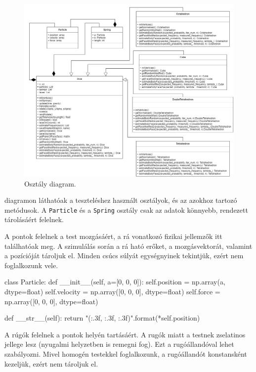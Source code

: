 \begin{figure}[h!]
	\centering
	\includegraphics[width=\textwidth]{images/uml.png}
	\caption{Osztály diagram.}
	\label{fig:uml}
\end{figure}

 diagramon láthatóak a teszteléshez használt osztályok, és az azokhoz tartozó metódusok.
A \texttt{Particle} és a \texttt{Spring} osztály csak az adatok könnyebb, rendezett tárolásáért felelnek.


A pontok felelnek a test mozgásáért, a rá vonatkozó fizikai jellemzők itt találhatóak meg.
A szimulálás során a rá ható erőket, a mozgásvektorát, valamint a pozícióját tároljuk el.
Minden csúcs súlyát egységnyinek tekintjük, ezért nem foglalkozunk vele.

\begin{python}
class Particle:
    def __init__(self, a=[0, 0, 0]):
        self.position = np.array(a, dtype=float) 
        self.velocity = np.array([0, 0, 0], dtype=float)
        self.force = np.array([0, 0, 0], dtype=float)

    def __str__(self):
        return "({:.3f}, {:.3f}, {:.3f})".format(*self.position)
\end{python}


A rúgók felelnek a pontok helyén tartásáért.
A rugók miatt a testnek zselatinos jellege lesz (nyugalmi helyzetben is remegni fog).
Ezt a rugóállandóval lehet szabályozni.
Mivel homogén testekkel foglalkozunk, a rugóállandót konstansként kezeljük, ezért nem tároljuk el.

